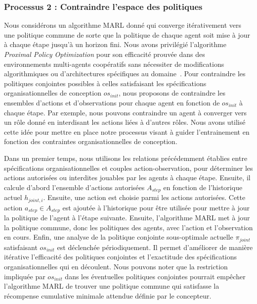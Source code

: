 \documentclass[contribution]{jfsma}
\newcounter{relation}
\begin{document}
\subsubsection{Processus 2 : Contraindre l'espace des politiques}

Nous considérons un algorithme MARL donné qui converge itérativement vers une politique commune de sorte que la politique de chaque agent soit mise à jour à chaque étape jusqu'à un horizon fini.
Nous avons privilégié l'algorithme \emph{Proximal Policy Optimization} pour son efficacité prouvée dans des environnements multi-agents coopératifs sans nécessiter de modifications algorithmiques ou d'architectures spécifiques au domaine~\cite{Yu2022}.
Pour contraindre les politiques conjointes possibles à celles satisfaisant les spécifications organisationnelles de conception $os_{init}$, nous proposons de contraindre les ensembles d'actions et d'observations pour chaque agent en fonction de $os_{init}$ à chaque étape. Par exemple, nous pouvons contraindre un agent à converger vers un rôle donné en interdisant les actions liées à d’autres rôles. Nous avons utilisé cette idée pour mettre en place notre processus visant à guider l'entrainement en fonction des contraintes organisationnelles de conception.

Dans un premier temps, nous utilisons les relations précédemment établies entre spécifications organisationnelles et couples action-observation, pour déterminer les actions autorisées ou interdites jouables par les agents à chaque étape.
Ensuite, il calcule d'abord l'ensemble d'actions autorisées $A_{step}$ en fonction de l'historique actuel $h_{joint,i}$. Ensuite, une action est choisie parmi les actions autorisées. Cette action $a_{step} \in A_{step}$ est ajoutée à l'historique pour être utilisée pour mettre à jour la politique de l'agent à l'étape suivante. Ensuite, l'algorithme MARL met à jour la politique commune, donc les politiques des agents, avec l'action et l'observation en cours.
Enfin, une analyse de la politique conjointe sous-optimale actuelle $\pi_{joint}$ satisfaisant $os_{init}$ est déclenchée périodiquement. Il permet d’améliorer de manière itérative l’efficacité des politiques conjointes et l’exactitude des spécifications organisationnelles qui en découlent.
Nous pouvons noter que la restriction impliquée par $os_{init}$ dans les éventuelles politiques conjointes pourrait empêcher l'algorithme MARL de trouver une politique commune qui satisfasse la récompense cumulative minimale attendue définie par le concepteur.
\end{document}
